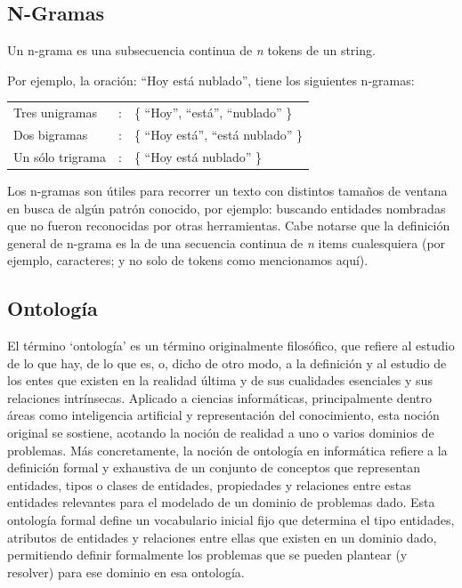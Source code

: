 \subsection*{N-Gramas}
Un n-grama es una subsecuencia continua de \textit{n} tokens de un string.

Por ejemplo, la oración: {\textquotedblleft}Hoy está nublado{\textquotedblright}, tiene los siguientes n-gramas:

\begin{tabular}{lll}
Tres unigramas & : & \{ {\textquotedblleft}Hoy{\textquotedblright}, {\textquotedblleft}está{\textquotedblright}, {\textquotedblleft}nublado{\textquotedblright} \} \\
Dos bigramas & : & \{ {\textquotedblleft}Hoy está{\textquotedblright}, {\textquotedblleft}está nublado{\textquotedblright} \} \\
Un sólo trigrama & : & \{ {\textquotedblleft}Hoy está nublado{\textquotedblright} \}\\
\end{tabular}
\medskip

Los n-gramas son útiles para recorrer un texto con distintos tamaños de ventana en busca de algún patrón conocido, por ejemplo: buscando entidades nombradas que no fueron reconocidas por otras herramientas. Cabe notarse que la definición general de n-grama es la de una secuencia continua de \textit{n} items cualesquiera (por ejemplo, caracteres; y no solo de tokens como mencionamos aquí).

\subsection*{Ontología}
El término `ontología' es un término originalmente filosófico, que refiere al estudio de lo que hay, de lo que es, o, dicho de otro modo, a la definición y al estudio de los entes que existen en la realidad última y de sus cualidades esenciales y sus relaciones intrínsecas. Aplicado a ciencias informáticas, principalmente dentro áreas como inteligencia artificial y representación del conocimiento, esta noción original se sostiene, acotando la noción de realidad a uno o varios dominios de problemas. Más concretamente, la noción de ontología en informática refiere a la definición formal y exhaustiva de un conjunto de conceptos que representan entidades, tipos o clases de entidades, propiedades y relaciones entre estas entidades relevantes para el modelado de un dominio de problemas dado. Esta ontología formal define un vocabulario inicial fijo que determina el tipo entidades, atributos de entidades y relaciones entre ellas que existen en un dominio dado, permitiendo definir formalmente los problemas que se pueden plantear (y resolver) para ese dominio en esa ontología.

